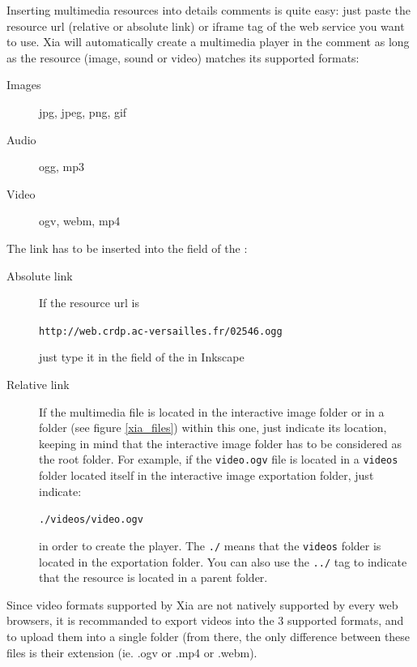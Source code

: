 Inserting multimedia resources into details comments is quite easy: just paste 
the resource url (relative or absolute link) or iframe tag of the web service 
you want to use. Xia will automatically create a multimedia player in the comment as long as 
the resource (image, sound or video) matches its supported formats: 
\begin{description}
 \item [Images] jpg, jpeg, png, gif
 \item [Audio] ogg, mp3
 \item [Video] ogv, webm, mp4
\end{description}

The link has to be inserted into the  field of the :
\begin{description}
 \item[Absolute link] If the resource url is
 
 \verb|http://web.crdp.ac-versailles.fr/02546.ogg|
 
 just type it in the  field of the  in 
 Inkscape
 
 \item [Relative link] If the multimedia file is located in the interactive image 
 folder or in a folder (see figure \ref{xia_files}) within this one, just indicate its location, keeping in 
 mind that the interactive image folder has to be considered as the root folder. 
 For example, if the \verb|video.ogv| file is located in a \verb|videos| 
 folder located itself in the interactive image exportation folder, just indicate:
 
  \verb|./videos/video.ogv|
 
  in order to create the player. The \verb|./| means that the \verb|videos| folder
  is located in the exportation folder. You can also use the \verb|../| tag to indicate
  that the resource is located in a parent folder.
\end{description}

Since video formats supported by Xia are not natively supported by every web 
browsers, it is recommanded to export videos into the 3 supported formats, 
and to upload them into a single folder (from there, the only difference 
between these files is their extension (ie. .ogv or .mp4 or .webm).\\




